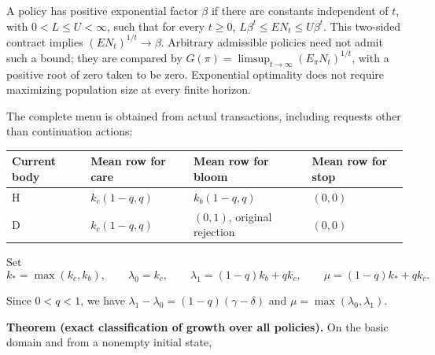 \documentclass[
  english,
  11pt,
  oneside]{book}
\newcounter{none} %
\begin{document}
A policy has positive exponential factor \(\beta\) if there are constants independent of \(t\), with \(0<L\le U<\infty\), such that for every \(t\ge0\), \(L\beta^t\le E N_t\le U\beta^t\). This two-sided contract implies \((E N_t)^{1/t}\to\beta\). Arbitrary admissible policies need not admit such a bound; they are compared by \(G(\pi)=\limsup_{t\to\infty}(E_\pi N_t)^{1/t}\), with a positive root of zero taken to be zero. Exponential optimality does not require maximizing population size at every finite horizon.

The complete menu is obtained from actual transactions, including requests other than continuation actions:

{\def\LTcaptype{none} %
\begin{longtable}[]{@{}
  >{\raggedright\arraybackslash}p{}
  >{\raggedright\arraybackslash}p{}
  >{\raggedright\arraybackslash}p{}
  >{\raggedright\arraybackslash}p{}@{}}
\toprule\noalign{}
\begin{minipage}[b]{\linewidth}\raggedright
Current body
\end{minipage} & \begin{minipage}[b]{\linewidth}\raggedright
Mean row for care
\end{minipage} & \begin{minipage}[b]{\linewidth}\raggedright
Mean row for bloom
\end{minipage} & \begin{minipage}[b]{\linewidth}\raggedright
Mean row for stop
\end{minipage} \\
\midrule\noalign{}
\endhead
\bottomrule\noalign{}
\endlastfoot
H & \(k_c(1-q,q)\) & \(k_b(1-q,q)\) & \((0,0)\) \\
D & \(k_c(1-q,q)\) & \((0,1)\), original rejection & \((0,0)\) \\
\end{longtable}
}

Set \[k_*=\max(k_c,k_b),\qquad
\lambda_0=k_c,\qquad \lambda_1=(1-q)k_b+qk_c,\qquad
\mu=(1-q)k_*+qk_c.\]

Since \(0<q<1\), we have \(\lambda_1-\lambda_0=(1-q)(\gamma-\delta)\) and \(\mu=\max(\lambda_0,\lambda_1)\).

\textbf{Theorem (exact classification of growth over all policies).} On the basic domain and from a nonempty initial state,
\end{document}
